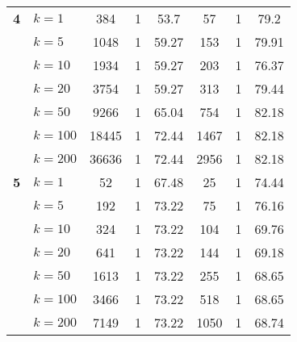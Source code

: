 \begin{table}[htbp]
\begin{tabular}{|l|l|c|c|c|c|c|c|}
    \multicolumn{1}{|r|}{\textbf{4}} & $k=1$ & 384 & 1 & 53.7 & 57 & 1 & 79.2 \\ 
     & $k=5$ & 1048 & 1 & 59.27 & 153 & 1 & 79.91 \\ 
     & $k=10$ & 1934 & 1 & 59.27 & 203 & 1 & 76.37 \\ 
     & $k=20$ & 3754 & 1 & 59.27 & 313 & 1 & 79.44 \\ 
     & $k=50$ & 9266 & 1 & 65.04 & 754 & 1 & 82.18 \\ 
     & $k=100$ & 18445 & 1 & 72.44 & 1467 & 1 & 82.18 \\ 
     & $k=200$ & 36636 & 1 & 72.44 & 2956 & 1 & 82.18 \\ \hline
    \multicolumn{1}{|r|}{\textbf{5}} & $k=1$ & 52 & 1 & 67.48 & 25 & 1 & 74.44 \\ 
     & $k=5$ & 192 & 1 & 73.22 & 75 & 1 & 76.16 \\ 
     & $k=10$ & 324 & 1 & 73.22 & 104 & 1 & 69.76 \\ 
     & $k=20$ & 641 & 1 & 73.22 & 144 & 1 & 69.18 \\ 
     & $k=50$ & 1613 & 1 & 73.22 & 255 & 1 & 68.65 \\ 
     & $k=100$ & 3466 & 1 & 73.22 & 518 & 1 & 68.65 \\ 
     & $k=200$ & 7149 & 1 & 73.22 & 1050 & 1 & 68.74 \\ \hline
    \end{tabular}
    \end{table}
